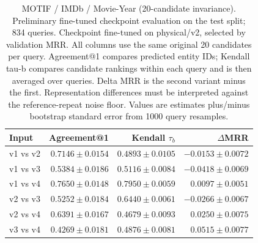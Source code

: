 \begin{table}[t]
\centering
\small
\begin{tabular}{lrrr}
\toprule
Input & Agreement@1 & Kendall $\tau_b$ & $\Delta$MRR \\
\midrule
v1 vs v2 & $0.7146 \pm 0.0154$ & $0.4893 \pm 0.0105$ & $-0.0153 \pm 0.0072$ \\
v1 vs v3 & $0.5384 \pm 0.0186$ & $0.5116 \pm 0.0084$ & $-0.0418 \pm 0.0069$ \\
v1 vs v4 & $0.7650 \pm 0.0148$ & $0.7950 \pm 0.0059$ & $0.0097 \pm 0.0051$ \\
v2 vs v3 & $0.5252 \pm 0.0184$ & $0.6440 \pm 0.0061$ & $-0.0266 \pm 0.0067$ \\
v2 vs v4 & $0.6391 \pm 0.0167$ & $0.4679 \pm 0.0093$ & $0.0250 \pm 0.0075$ \\
v3 vs v4 & $0.4269 \pm 0.0181$ & $0.4876 \pm 0.0081$ & $0.0515 \pm 0.0077$ \\
\bottomrule
\end{tabular}
\caption{MOTIF / IMDb / Movie-Year (20-candidate invariance). Preliminary fine-tuned checkpoint evaluation on the test split; 834 queries. Checkpoint fine-tuned on physical/v2, selected by validation MRR. All columns use the same original 20 candidates per query. Agreement@1 compares predicted entity IDs; Kendall tau-b compares candidate rankings within each query and is then averaged over queries. Delta MRR is the second variant minus the first. Representation differences must be interpreted against the reference-repeat noise floor. Values are estimates plus/minus bootstrap standard error from 1000 query resamples.}
\label{tab:motif-movie_year-invariance}
\end{table}
